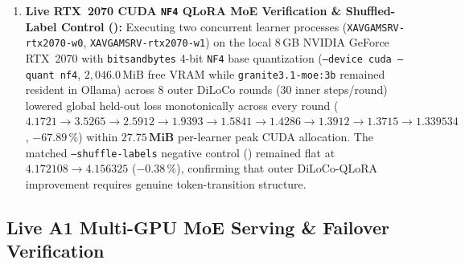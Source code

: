\documentclass[11pt,a4paper]{article}
\begin{document}
\begin{enumerate}[leftmargin=1.8em]
    \item \textbf{Live RTX~2070 CUDA \texttt{NF4} QLoRA MoE Verification \& Shuffled-Label Control ():} Executing two concurrent learner processes (\texttt{XAVGAMSRV-rtx2070-w0}, \texttt{XAVGAMSRV-rtx2070-w1}) on the local 8\,GB NVIDIA GeForce RTX~2070 with \texttt{bitsandbytes} 4-bit \texttt{NF4} base quantization (\texttt{--device cuda --quant nf4}, $2{,}046.0$\,MiB free VRAM while \texttt{granite3.1-moe:3b} remained resident in Ollama) across $8$ outer DiLoCo rounds ($30$ inner steps/round) lowered global held-out loss monotonically across every round ($4.1721 \to \allowbreak 3.5265 \to \allowbreak 2.5912 \to \allowbreak 1.9393 \to \allowbreak 1.5841 \to \allowbreak 1.4286 \to \allowbreak 1.3912 \to \allowbreak 1.3715 \to \allowbreak \mathbf{1.339534}$, $-67.89\,\%$) within $\mathbf{27.75\,\text{MiB}}$ per-learner peak CUDA allocation. The matched \texttt{--shuffle-labels} negative control () remained flat at $\mathbf{4.172108 \to 4.156325}$ ($-0.38\,\%$), confirming that outer DiLoCo-QLoRA improvement requires genuine token-transition structure.
\end{enumerate}

\subsection{Live A1 Multi-GPU MoE Serving \& Failover Verification}
\label{sec:v430_a1_multi_gpu}
\end{document}
